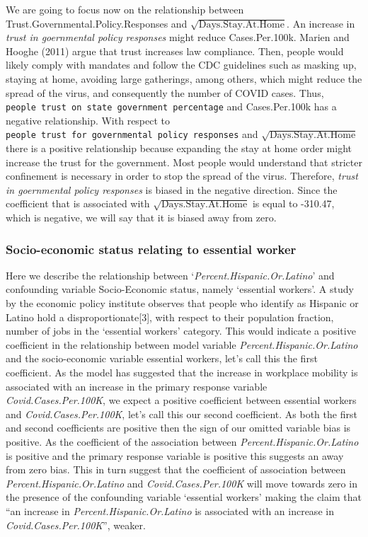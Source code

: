 \documentclass[
]{article}
\begin{document}
We are going to focus now on the relationship between
Trust.Governmental.Policy.Responses and
\(\sqrt{\text{Days.Stay.At.Home}}\). An increase in \emph{trust in
goernmental policy responses} might reduce Cases.Per.100k. Marien and
Hooghe (2011) argue that trust increases law compliance. Then, people
would likely comply with mandates and follow the CDC guidelines such as
masking up, staying at home, avoiding large gatherings, among others,
which might reduce the spread of the virus, and consequently the number
of COVID cases. Thus,
\texttt{people\ trust\ on\ state\ government\ percentage} and
Cases.Per.100k has a negative relationship. With respect to
\texttt{people\ trust\ for\ governmental\ policy\ responses} and
\(\sqrt{\text{Days.Stay.At.Home}}\) there is a positive relationship
because expanding the stay at home order might increase the trust for
the government. Most people would understand that stricter confinement
is necessary in order to stop the spread of the virus. Therefore,
\emph{trust in goernmental policy responses} is biased in the negative
direction. Since the coefficient that is associated with
\(\sqrt{\text{Days.Stay.At.Home}}\) is equal to -310.47, which is
negative, we will say that it is biased away from zero.

\hypertarget{socio-economic-status-relating-to-essential-worker}{%
\subsubsection{Socio-economic status relating to essential
worker}\label{socio-economic-status-relating-to-essential-worker}}

Here we describe the relationship between
`\emph{Percent.Hispanic.Or.Latino}' and confounding variable
Socio-Economic status, namely `essential workers'. A study by the
economic policy institute observes that people who identify as Hispanic
or Latino hold a disproportionate{[}3{]}, with respect to their
population fraction, number of jobs in the `essential workers' category.
This would indicate a positive coefficient in the relationship between
model variable \emph{Percent.Hispanic.Or.Latino} and the socio-economic
variable essential workers, let's call this the first coefficient. As
the model has suggested that the increase in workplace mobility is
associated with an increase in the primary response variable
\emph{Covid.Cases.Per.100K}, we expect a positive coefficient between
essential workers and \emph{Covid.Cases.Per.100K}, let's call this our
second coefficient. As both the first and second coefficients are
positive then the sign of our omitted variable bias is positive. As the
coefficient of the association between \emph{Percent.Hispanic.Or.Latino}
is positive and the primary response variable is positive this suggests
an away from zero bias. This in turn suggest that the coefficient of
association between \emph{Percent.Hispanic.Or.Latino} and
\emph{Covid.Cases.Per.100K} will move towards zero in the presence of
the confounding variable `essential workers' making the claim that ``an
increase in \emph{Percent.Hispanic.Or.Latino} is associated with an
increase in \emph{Covid.Cases.Per.100K}'', weaker.
\end{document}
